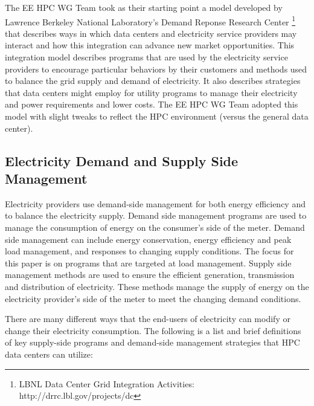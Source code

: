 The EE HPC WG Team took as their starting point a model developed by Lawrence
Berkeley National Laboratory's Demand Reponse Research Center \footnote{LBNL
Data Center Grid Integration Activities: http://drrc.lbl.gov/projects/dc} that
describes ways in which data centers and electricity service providers may
interact and how this integration can advance new market opportunities. This
integration model describes programs that are used by the electricity service
providers to encourage particular behaviors by their customers and methods used
to balance the grid supply and demand of electricity. It also describes
strategies that data centers might employ for utility programs to manage their
electricity and power requirements and lower costs. The EE HPC WG Team adopted
this model with slight tweaks to reflect the HPC environment (versus the
general data center).


\subsection{Electricity Demand and Supply Side Management}

Electricity providers use demand-side management for both energy efficiency and to balance the electricity supply. 
Demand side management programs are used to manage the consumption of energy on the consumer’s side of the meter.  
Demand side management can include energy conservation, energy efficiency and peak load management, and responses to 
changing supply conditions.  The focus for this paper is on programs that are targeted at load management. 
Supply side management methods are used to ensure the efficient generation, transmission and distribution of 
electricity.  These methods 
manage the supply of energy on the electricity provider’s side of the meter to meet the changing demand conditions. 

There are many different ways that the end-users of electricity can modify or change their electricity consumption. 
The following is a list and 
brief definitions of key supply-side programs and demand-side management strategies that HPC data centers can utilize:



